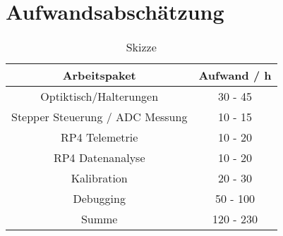 \section*{Aufwandsabschätzung}
\begin{table}[H]
    \centering
    \caption{
        Skizze
    }
    \begin{tabular}{| c | c |}
        \hline
        Arbeitspaket &  Aufwand / h\\
        \hline
        Optiktisch/Halterungen & 30 - 45  \\
        \hline
        Stepper Steuerung / ADC Messung & 10 - 15 \\
        \hline
        RP4 Telemetrie & 10 - 20  \\
        \hline
        RP4 Datenanalyse & 10 - 20  \\
        \hline
        Kalibration & 20 - 30 \\
        \hline
        Debugging & 50 - 100 \\
        \hline
        \hline
        Summe & 120 - 230  \\
        \hline
    \end{tabular}
    \label{tab:Aufwand}
\end{table}